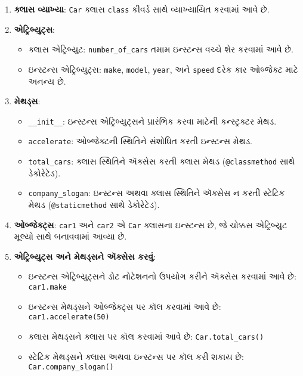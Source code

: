 \begin{enumerate}
\def\labelenumi{\arabic{enumi}.}
\item
  \textbf{ક્લાસ વ્યાખ્યા}: \texttt{Car} ક્લાસ \texttt{class} કીવર્ડ સાથે
  વ્યાખ્યાયિત કરવામાં આવે છે.
\item
  \textbf{એટ્રિબ્યુટ્સ}:

  \begin{itemize}
  \tightlist
  \item
    ક્લાસ એટ્રિબ્યુટ: \texttt{number\_of\_cars} તમામ ઇન્સ્ટન્સ વચ્ચે શેર કરવામાં આવે
    છે.
  \item
    ઇન્સ્ટન્સ એટ્રિબ્યુટ્સ: \texttt{make}, \texttt{model}, \texttt{year}, અને
    \texttt{speed} દરેક કાર ઓબ્જેક્ટ માટે અનન્ય છે.
  \end{itemize}
\item
  \textbf{મેથડ્સ}:

  \begin{itemize}
  \tightlist
  \item
    \texttt{\_\_init\_\_}: ઇન્સ્ટન્સ એટ્રિબ્યુટ્સને પ્રારંભિક કરવા માટેની કન્સ્ટ્રક્ટર
    મેથડ.
  \item
    \texttt{accelerate}: ઓબ્જેક્ટની સ્થિતિને સંશોધિત કરતી ઇન્સ્ટન્સ મેથડ.
  \item
    \texttt{total\_cars}: ક્લાસ સ્થિતિને ઍક્સેસ કરતી ક્લાસ મેથડ
    (\texttt{@classmethod} સાથે ડેકોરેટેડ).
  \item
    \texttt{company\_slogan}: ઇન્સ્ટન્સ અથવા ક્લાસ સ્થિતિને ઍક્સેસ ન કરતી સ્ટેટિક
    મેથડ (\texttt{@staticmethod} સાથે ડેકોરેટેડ).
  \end{itemize}
\item
  \textbf{ઓબ્જેક્ટ્સ}: \texttt{car1} અને \texttt{car2} એ \texttt{Car} ક્લાસના
  ઇન્સ્ટન્સ છે, જે ચોક્કસ એટ્રિબ્યુટ મૂલ્યો સાથે બનાવવામાં આવ્યા છે.
\item
  \textbf{એટ્રિબ્યુટ્સ અને મેથડ્સને ઍક્સેસ કરવું}:

  \begin{itemize}
  \tightlist
  \item
    ઇન્સ્ટન્સ એટ્રિબ્યુટ્સને ડોટ નોટેશનનો ઉપયોગ કરીને ઍક્સેસ કરવામાં આવે છે:
    \texttt{car1.make}
  \item
    ઇન્સ્ટન્સ મેથડ્સને ઓબ્જેક્ટ્સ પર કૉલ કરવામાં આવે છે: \texttt{car1.accelerate(50)}
  \item
    ક્લાસ મેથડ્સને ક્લાસ પર કૉલ કરવામાં આવે છે: \texttt{Car.total\_cars()}
  \item
    સ્ટેટિક મેથડ્સને ક્લાસ અથવા ઇન્સ્ટન્સ પર કૉલ કરી શકાય છે:
    \texttt{Car.company\_slogan()}
  \end{itemize}
\end{enumerate}


